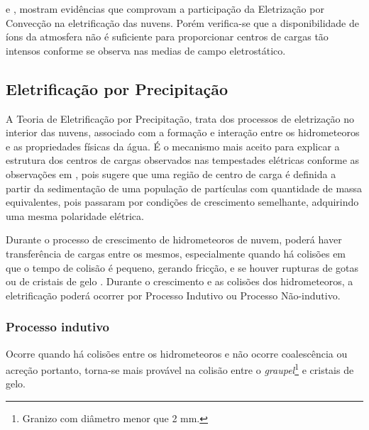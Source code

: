  e , mostram evidências que comprovam a participação da Eletrização por Convecção na eletrificação das nuvens. Porém verifica-se que a disponibilidade de íons da atmosfera não é suficiente para proporcionar centros de cargas tão intensos conforme se observa nas medias de campo eletrostático. 

\subsection{Eletrificação por Precipitação}

A Teoria de Eletrificação por Precipitação, trata dos processos de eletrização no interior das nuvens, associado com a formação e  interação entre os hidrometeoros e as propriedades físicas da água. É o mecanismo mais aceito para explicar a estrutura dos centros de cargas observados nas tempestades elétricas conforme as observações em , pois sugere que uma região de centro de carga é definida a partir da sedimentação de uma população de partículas com quantidade de massa equivalentes, pois passaram por condições de crescimento semelhante, adquirindo uma mesma polaridade elétrica. 



Durante o processo de crescimento de hidrometeoros de nuvem, poderá haver transferência de cargas entre os mesmos, especialmente quando há colisões em que o tempo de colisão é pequeno, gerando fricção, e se houver rupturas de gotas ou de cristais de gelo \cite{Lenard1892, reynolds1957, matthews1964, jonas1968, simpson1909}. Durante o crescimento e as colisões dos hidrometeoros, a eletrificação poderá ocorrer por Processo Indutivo ou Processo Não-indutivo.


\subsubsection{Processo indutivo} 

Ocorre quando há colisões entre os hidrometeoros e não ocorre coalescência ou acreção portanto, torna-se mais provável na colisão entre o \textit{graupel}\footnote{Granizo com diâmetro menor que 2 mm.} e cristais de gelo.

